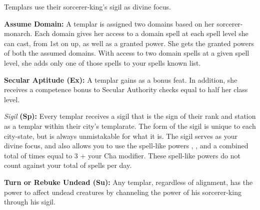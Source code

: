 Templars use their sorcerer-king's sigil as divine focus.

\textbf{Assume Domain:} A templar is assigned two domains based on her sorcerer-monarch. Each domain gives her access to a domain spell at each spell level she can cast, from 1st on up, as well as a granted power. She gets the granted powers of both the assumed domains. With access to two domain spells at a given spell level, she adds only one of those spells to your spells known list.


\textbf{Secular Aptitude (Ex):} A templar gains  as a bonus feat. In addition, she receives a competence bonus to Secular Authority checks equal to half her class level.

\textit{Sigil} \textbf{(Sp):} Every templar receives a sigil that is the sign of their rank and station as a templar within their city's templarate. The form of the sigil is unique to each city-state, but is always unmistakable for what it is. The sigil serves as your divine focus, and also allows you to use the spell-like powers , , and  a combined total of times equal to 3 + your Cha modifier. These spell-like powers do not count against your total of spells per day.

\textbf{Turn or Rebuke Undead (Su):} Any templar, regardless of alignment, has the power to affect undead creatures by channeling the power of his sorcerer-king through his sigil.


